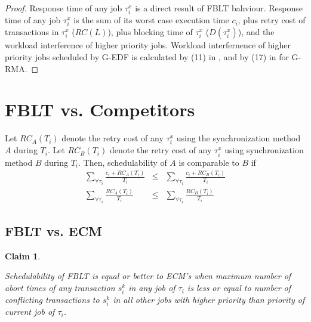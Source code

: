 \documentclass[12pt,english]{report}
\newtheorem{clm}{Claim}
\newtheorem{proof}{Proof}
\begin{document}
\begin{proof}

Response time of any job $\tau_{i}^{x}$ is a direct result of FBLT
bahviour. Response time of any job $\tau_{i}^{x}$ is the sum of its
worst case execution time $c_{i}$, plus retry cost of transactions
in $\tau_{i}^{x}$ ($RC(L)$), plus blocking time of $\tau_{i}^{x}$
($D(\tau_{i}^{x})$), and the workload interference of higher priority
jobs. Workload interfernence of higher priority jobs scheduled by
G-EDF is calculated by (11) in \cite{stmconcurrencycontrol:emsoft11},
and by (17) in \cite{stmconcurrencycontrol:emsoft11} for G-RMA. 

\end{proof}


\section{FBLT vs. Competitors}

Let $RC_{A}(T_{i})$ denote the retry cost of any $\tau_{i}^{x}$
using the synchronization method $A$ during $T_{i}$. Let $RC_{B}(T_{i})$
denote the retry cost of any $\tau_{i}^{x}$ using synchronization
method $B$ during $T_{i}$. Then, schedulability of $A$ is comparable
to $B$ if 
\begin{eqnarray}
\sum_{\forall\tau_{i}}\frac{c_{i}+RC_{A}(T_{i})}{T_{i}} & \le & \sum_{\forall\tau_{i}}\frac{c_{i}+RC_{B}(T_{i})}{T_{i}}\nonumber \\
\sum_{\forall\tau_{i}}\frac{RC_{A}(T_{i})}{T_{i}} & \le & \sum_{\forall\tau_{i}}\frac{RC_{B}(T_{i})}{T_{i}}\label{eq:utilization comparison}
\end{eqnarray}



\subsection{FBLT vs. ECM}

\begin{clm}\label{clm:fblt_ecm}

Schedulability of FBLT is equal or better to ECM's when maximum number
of abort times of any transaction $s_i^k$ in any job of $\tau_{i}$ is less
or equal to number of conflicting transactions to $s_i^k$ in all other jobs with higher priority than priority of current job of $\tau_{i}$.

\end{clm}
\end{document}
